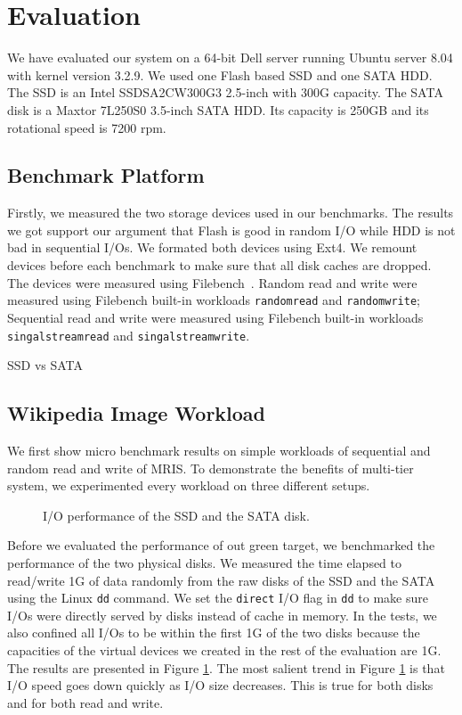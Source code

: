 \section{Evaluation} \label{sec:eval}

We have evaluated our system on a 64-bit Dell server running Ubuntu
server 8.04 with kernel version 3.2.9. We used one Flash based SSD and
one SATA HDD. The SSD is an Intel SSDSA2CW300G3 2.5-inch with 300G
capacity. The SATA disk is a Maxtor 7L250S0 3.5-inch SATA HDD. Its
capacity is 250GB and its rotational speed is 7200 rpm.

\subsection{Benchmark Platform}

Firstly, we measured the two storage devices used in our benchmarks.
The results we got support our argument that Flash is good in random
I/O while HDD is not bad in sequential I/Os. We formated both devices
using Ext4. We remount devices before each benchmark to make sure that
all disk caches are dropped. The devices were measured using
Filebench~\cite{filebench-web}. Random read and write were measured
using Filebench built-in workloads \texttt{randomread} and
\texttt{randomwrite}; Sequential read and write were measured using
Filebench built-in workloads \texttt{singalstreamread} and
\texttt{singalstreamwrite}.

SSD vs SATA

\subsection{Wikipedia Image Workload}

We first show micro benchmark results on simple workloads of
sequential and random read and write of MRIS. To demonstrate the
benefits of multi-tier system, we experimented every workload on three
different setups. 

\begin{figure}[t]
\begin{centering}
\caption{I/O performance of the SSD and the SATA disk. }
\label{fig:ssd_vs_sata}
\end{centering}
\end{figure}

Before we evaluated the performance of out green target, we
benchmarked the performance of the two physical disks.  We measured
the time elapsed to read/write 1G of data randomly from the raw disks
of the SSD and the SATA using the Linux \texttt{dd} command. We set
the \texttt{direct} I/O flag in \texttt{dd} to make sure I/Os were
directly served by disks instead of cache in memory.  In the tests, we
also confined all I/Os to be within the first 1G of the two disks
because the capacities of the virtual devices we created in the rest
of the evaluation are 1G. The results are presented in Figure
\ref{fig:ssd_vs_sata}. The most salient trend in Figure
\ref{fig:ssd_vs_sata} is that I/O speed goes down quickly as I/O size
decreases. This is true for both disks and for both read and write. 

